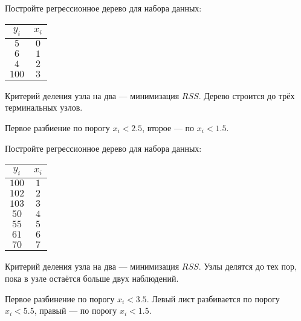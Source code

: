 \begin{problem}
Постройте регрессионное дерево для набора данных:

\begin{tabular}{cc}
\toprule
$y_i$ & $x_i$ \\
\midrule
$5$ & $0$ \\
$6$ & $1$ \\
$4$ & $2$ \\
$100$ & $3$ \\
\bottomrule
\end{tabular}

Критерий деления узла на два — минимизация $RSS$. Дерево строится до трёх терминальных узлов.


\begin{sol}
Первое разбиение по порогу $x_i < 2.5$, второе — по $x_i < 1.5$.
\end{sol}
\end{problem}

\begin{problem}
Постройте регрессионное дерево для набора данных:

\begin{tabular}{cc}
\toprule
$y_i$ & $x_i$ \\
\midrule
$100$ & $1$ \\
$102$ & $2$ \\
$103$ & $3$ \\
$50$ & $4$ \\
$55$ & $5$ \\
$61$ & $6$ \\
$70$ & $7$ \\
\bottomrule
\end{tabular}

Критерий деления узла на два — минимизация $RSS$. Узлы делятся до тех пор, пока в узле остаётся больше двух наблюдений.
\begin{sol}
Первое разбинение по порогу $x_i < 3.5$. Левый лист разбивается по порогу $x_i < 5.5$, правый — по порогу $x_i < 1.5$.
\end{sol}
\end{problem}




